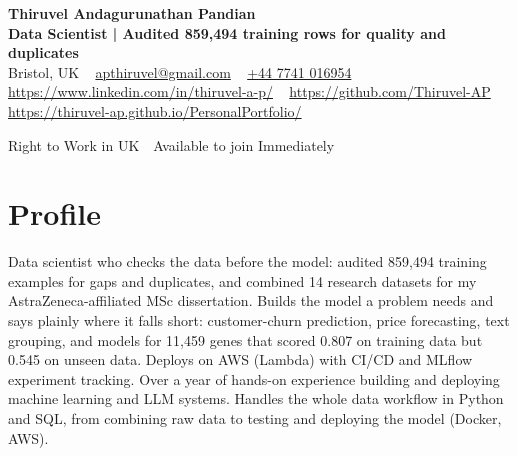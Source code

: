 \documentclass[a4paper,11pt]{article}
\newcommand{\num}[1]{\textbf{#1}}   %
\begin{document}
\begin{center}
  {\LARGE\bfseries Thiruvel Andagurunathan Pandian} \\[3pt]
  {\color{headernavy}\small\textbf{Data Scientist | Audited \num{859,494} training rows for quality and duplicates}} \\[3pt]
  {\small
  Bristol, UK\nobreak\ \,\textbar\, \href{mailto:apthiruvel@gmail.com}{apthiruvel@gmail.com}\nobreak\ \,\textbar\, \href{tel:+447741016954}{+44 7741 016954}\nobreak\ \,\textbar\, \href{https://www.linkedin.com/in/thiruvel-a-p/}{https://www.linkedin.com/in/thiruvel-a-p/}\nobreak\ \,\textbar\, \href{https://github.com/Thiruvel-AP}{https://github.com/Thiruvel-AP}\nobreak\ \,\textbar\, \href{https://thiruvel-ap.github.io/PersonalPortfolio/}{https://thiruvel-ap.github.io/PersonalPortfolio/}}\par\vspace{4pt}
  \noindent{} Right to Work in UK \,\textbar\, Available to join Immediately
\end{center}

\section{Profile}
Data scientist who checks the data before the model: audited 859,494 training examples for gaps and duplicates, and combined 14 research datasets for my AstraZeneca-affiliated MSc dissertation. Builds the model a problem needs and says plainly where it falls short: customer-churn prediction, price forecasting, text grouping, and models for 11,459 genes that scored 0.807 on training data but 0.545 on unseen data. Deploys on AWS (Lambda) with CI/CD and MLflow experiment tracking. Over a year of hands-on experience building and deploying machine learning and LLM systems. Handles the whole data workflow in Python and SQL, from combining raw data to testing and deploying the model (Docker, AWS).
\end{document}
